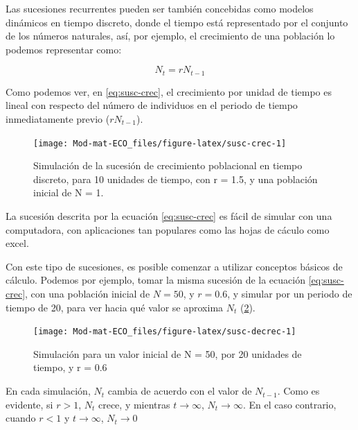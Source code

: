 \documentclass[
]{book}
\begin{document}
Las sucesiones recurrentes pueden ser también concebidas como modelos dinámicos en tiempo discreto, donde el tiempo está representado por el conjunto de los números naturales, así, por ejemplo, el crecimiento de una población lo podemos representar como:

\begin{equation}
    N_{t} = r N_{t-1} \label{eq:susc-crec}
\end{equation}

Como podemos ver, en \eqref{eq:susc-crec}, el crecimiento por unidad de tiempo es lineal con respecto del número de individuos en el periodo de tiempo inmediatamente previo (\(rN_{t-1}\)).

\begin{figure}

{\centering \texttt{[image: Mod-mat-ECO\_files/figure-latex/susc-crec-1]} 

}

\caption{Simulación de la sucesión de crecimiento poblacional en tiempo discreto, para 10 unidades de tiempo, con r = 1.5, y una población inicial de N = 1.}\label{fig:susc-crec}
\end{figure}

La sucesión descrita por la ecuación \eqref{eq:susc-crec} es fácil de simular con una computadora, con aplicaciones tan populares como las hojas de cáculo como excel.

Con este tipo de sucesiones, es posible comenzar a utilizar conceptos básicos de cálculo. Podemos por ejemplo, tomar la misma sucesión de la ecuación \eqref{eq:susc-crec}, con una población inicial de \(N = 50\), y \(r = 0.6\), y simular por un periodo de tiempo de 20, para ver hacia qué valor se aproxima \(N_t\) (\ref{fig:susc-decrec}).

\begin{figure}

{\centering \texttt{[image: Mod-mat-ECO\_files/figure-latex/susc-decrec-1]} 

}

\caption{Simulación para un valor inicial de N = 50, por 20 unidades de tiempo, y r = 0.6}\label{fig:susc-decrec}
\end{figure}

En cada simulación, \(N_t\) cambia de acuerdo con el valor de \(N_{t-1}\). Como es evidente, si \(r > 1\), \(N_t\) crece, y mientras \(t \rightarrow \infty\), \(N_t \rightarrow \infty\). En el caso contrario, cuando \(r < 1\) y \(t \rightarrow \infty\), \(N_t \rightarrow 0\)
\end{document}
